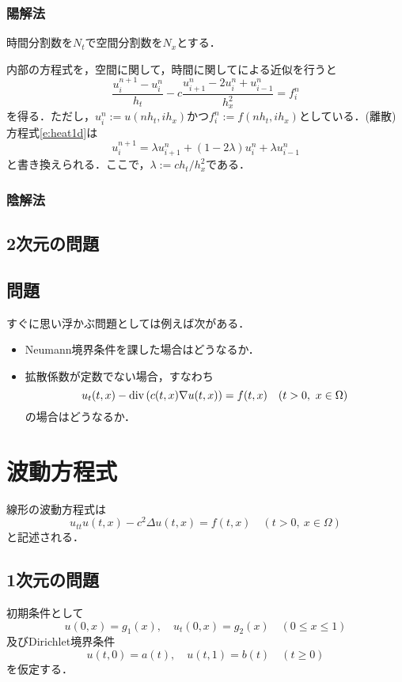 \subsubsection{陽解法}
時間分割数を$N_t$で空間分割数を$N_x$とする．

内部の方程式を，空間に関して，時間に関してによる近似を行うと
\begin{equation}
\label{e:heat1d}
\frac{u^{n+1}_{i}-u^{n}_{i}}{h_t}-c\frac{u^{n}_{i+1}-2u^{n}_{i}+u^{n}_{i-1}}{h_x^{2}}=f_i^n
\end{equation}
を得る．ただし，$u_i^n:=u(nh_t,ih_x)$かつ$f_i^n:=f(nh_t,ih_x)$としている．(離散)方程式\eqref{e:heat1d}は
$$
u^{n+1}_{i}=\lambda u^{n}_{i+1}+(1-2\lambda)u^{n}_{i}+\lambda u^{n}_{i-1}
$$
と書き換えられる．ここで，$\lambda:=ch_t/h_x^{2}$である．


\subsubsection{陰解法}


\subsection{2次元の問題}



\subsection{問題}
すぐに思い浮かぶ問題としては例えば次がある．
\begin{itemize}
\item Neumann境界条件を課した場合はどうなるか．
\item 拡散係数が定数でない場合，すなわち
$$
u_t(t,x)-\operatorname{\mathrm{div}\,}(c(t,x)\nabla u(t,x))=f(t,x)\quad(t>0,\ x\in\Omega)
$$
の場合はどうなるか．
\end{itemize}







\section{波動方程式}
線形の波動方程式は
\begin{equation}
\label{e:wave}
u_{tt}u(t,x)-c^2\Delta u(t,x)=f(t,x)\quad(t>0,\ x\in\Omega)
\end{equation}
と記述される．


\subsection{ 1次元の問題}
初期条件として
\begin{equation}
\label{e:waveinitial}
u(0,x)=g_1(x),\quad u_t(0,x)=g_2(x)\quad(0\le x\le 1)
\end{equation}
及びDirichlet境界条件
\begin{equation}
\label{e:wave1ddirichlet}
u(t,0)=a(t),\quad u(t,1)=b(t)\quad(t\ge0)
\end{equation}
を仮定する．

